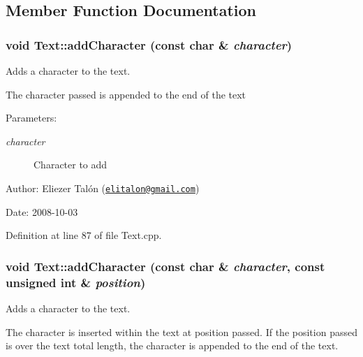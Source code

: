 \subsection{Member Function Documentation}
\hypertarget{class_text_6e6da63c90af68639adc7dd1336f6bf9}{
\subsubsection[addCharacter]{\setlength{\rightskip}{0pt plus 5cm}void Text::addCharacter (const char \& {\em character})}}
\label{class_text_6e6da63c90af68639adc7dd1336f6bf9}


Adds a character to the text. 

The character passed is appended to the end of the text

\begin{Desc}
\item[Parameters:]
\begin{description}
\item[{\em character}]Character to add\end{description}
\end{Desc}
\begin{Desc}
\item[Author:]Eliezer Talón (\href{mailto:elitalon@gmail.com}{\tt elitalon@gmail.com}) \end{Desc}
\begin{Desc}
\item[Date:]2008-10-03 \end{Desc}


Definition at line 87 of file Text.cpp.\hypertarget{class_text_fdd11ad0c90ca483d4cff3d74a64da9e}{
\subsubsection[addCharacter]{\setlength{\rightskip}{0pt plus 5cm}void Text::addCharacter (const char \& {\em character}, \/  const unsigned int \& {\em position})}}
\label{class_text_fdd11ad0c90ca483d4cff3d74a64da9e}


Adds a character to the text. 

The character is inserted within the text at position passed. If the position passed is over the text total length, the character is appended to the end of the text.

